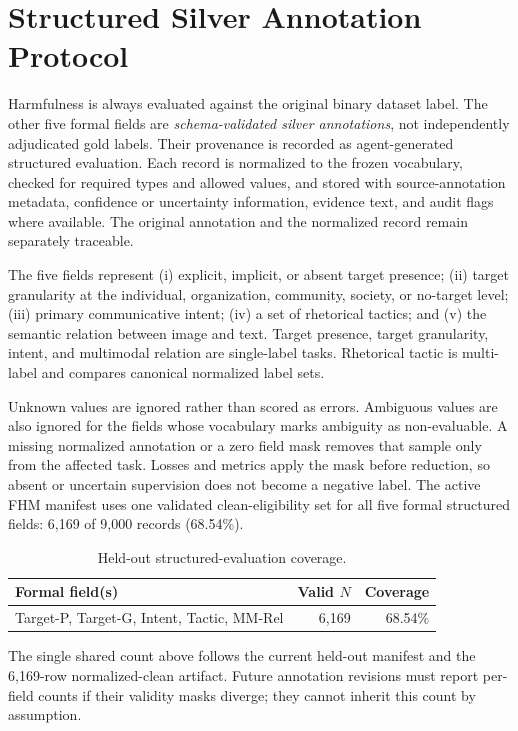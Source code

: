 \section{Structured Silver Annotation Protocol}
\label{sec:supp:annotations}

Harmfulness is always evaluated against the original binary dataset label.
The other five formal fields are \emph{schema-validated silver annotations},
not independently adjudicated gold labels.  Their provenance is recorded as
agent-generated structured evaluation.  Each record is normalized to the
frozen vocabulary, checked for required types and allowed values, and stored
with source-annotation metadata, confidence or uncertainty information,
evidence text, and audit flags where available.  The original annotation and
the normalized record remain separately traceable.

The five fields represent (i) explicit, implicit, or absent target presence;
(ii) target granularity at the individual, organization, community, society,
or no-target level; (iii) primary communicative intent; (iv) a set of
rhetorical tactics; and (v) the semantic relation between image and text.
Target presence, target granularity, intent, and multimodal relation are
single-label tasks.  Rhetorical tactic is multi-label and compares canonical
normalized label sets.

Unknown values are ignored rather than scored as errors.  Ambiguous values
are also ignored for the fields whose vocabulary marks ambiguity as
non-evaluable.  A missing normalized annotation or a zero field mask removes
that sample only from the affected task.  Losses and metrics apply the mask
before reduction, so absent or uncertain supervision does not become a
negative label.  The active FHM manifest uses one validated clean-eligibility
set for all five formal structured fields: 6,169 of 9,000 records (68.54\%).

\begin{table}[h]
  \caption{Held-out structured-evaluation coverage.}
  \label{tab:supp:coverage}
  \centering
  \begin{tabular}{@{}lrr@{}}
    \toprule
    Formal field(s) & Valid $N$ & Coverage \\
    \midrule
    Target-P, Target-G, Intent, Tactic, MM-Rel & 6,169 & 68.54\% \\
    \bottomrule
  \end{tabular}
\end{table}

The single shared count above follows the current held-out manifest and the
6,169-row normalized-clean artifact.  Future annotation revisions must
report per-field counts if their validity masks diverge; they cannot inherit
this count by assumption.
